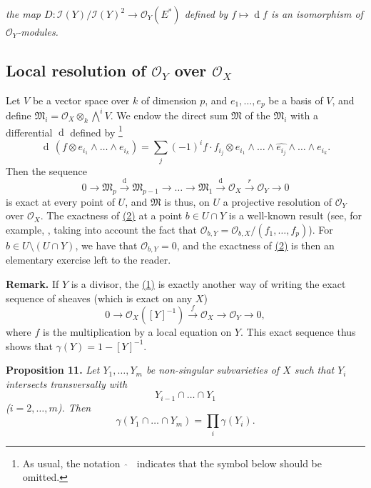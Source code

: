 \documentclass{article}
\newenvironment{itenv}[1]
  {\phantomsection\par\medskip\noindent\textbf{#1.}\itshape}
  {\par\medskip}
\newenvironment{rmenv}[1]
  {\phantomsection\par\medskip\noindent\textbf{#1.}\rmfamily}
  {\par\medskip}
\newcommand{\scr}[1]{{\mathscr{#1}}}
\newcommand{\dd}{\operatorname{d}\!}
\newcommand{\oldpage}[1]{\marginpar{\footnotesize$\Big\vert$ \textit{p.~#1}}}
\begin{document}
\medskip

\emph{the map $D\colon\scr{I}(Y)/\scr{I}(Y)^2 \to \scr{O}_Y(E^*)$ defined by $f\mapsto\dd f$ is an isomorphism of $\scr{O}_Y$-modules.}


\subsection{Local resolution of \texorpdfstring{$\scr{O}_Y$}{OY} over \texorpdfstring{$\scr{O}_X$}{OX}}
\label{subsection10c}

Let $V$ be a vector space over $k$ of dimension $p$, and $e_1,\ldots,e_p$ be a basis of $V$, and define $\mathfrak{M}_i = \scr{O}_X\otimes_k\bigwedge\nolimits^i V$.
We endow the direct sum $\mathfrak{M}$ of the $\mathfrak{M}_i$ with a differential $\dd$ defined by
\footnote{As usual, the notation $\,\,\widehat{\,}\,\,\,$ indicates that the symbol below should be omitted.}
\[
  \dd\,(f\otimes e_{i_1}\wedge\ldots\wedge e_{i_k})
  = \sum_j (-1)^i f\cdot f_{i_j}\otimes e_{i_1}\wedge\ldots\wedge \widehat{e_{i_j}} \wedge\ldots\wedge e_{i_k}.
\]
Then the sequence
\[
\label{section10cequation2}
  0 \to \mathfrak{M}_p \xrightarrow{\mathrm{d}} \mathfrak{M}_{p-1} \to \ldots \to \mathfrak{M}_1 \xrightarrow{\mathrm{d}} \scr{O}_X \xrightarrow{r} \scr{O}_Y \to 0
  \tag{2}
\]
is exact at every point of $U$, and $\mathfrak{M}$ is thus, on $U$ a
\oldpage{121}
projective resolution of $\scr{O}_Y$ over $\scr{O}_X$.
The exactness of \hyperref[section10cequation2]{(2)} at a point $b\in U\cap Y$ is a well-known result (see, for example, \cite[proposition~4.3, p.~151]{3}, taking into account the fact that $\scr{O}_{b,Y}=\scr{O}_{b,X}/(f_1,\ldots,f_p)$).
For $b\in U\setminus(U\cap Y)$, we have that $\scr{O}_{b,Y}=0$, and the exactness of \hyperref[section10cequation2]{(2)} is then an elementary exercise left to the reader.

\begin{rmenv}{Remark}
  If $Y$ is a divisor, the \hyperref[section10aequation1]{(1)} is exactly another way of writing the exact sequence of sheaves (which is exact on any $X$)
  \[
  \label{equation3}
    0 \to \scr{O}_X([Y]^{-1}) \xrightarrow{f} \scr{O}_X \to \scr{O}_Y \to 0,
    \tag{3}
  \]
  where $f$ is the multiplication by a local equation on $Y$.
  This exact sequence thus shows that $\gamma(Y)=1-[Y]^{-1}$.
\end{rmenv}

\begin{itenv}{Proposition 11}
\label{proposition11}
  Let $Y_1,\ldots,Y_m$ be non-singular subvarieties of $X$ such that $Y_i$ intersects transversally with
  \[
    Y_{i-1} \cap\ldots\cap Y_1
  \]
  ($i=2,\ldots,m$).
  Then
  \[
    \gamma(Y_1\cap\ldots\cap Y_m) = \prod_i\gamma(Y_i).
  \]
\end{itenv}
\end{document}
